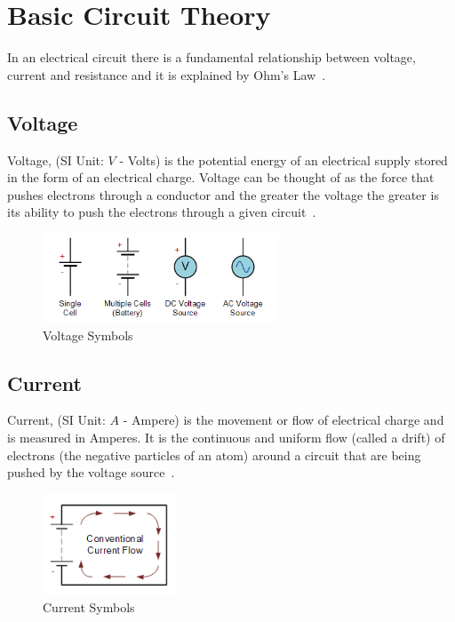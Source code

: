 \newpage
\section*{Basic Circuit Theory}

In an electrical circuit there is a fundamental relationship between voltage, current and resistance and it is explained by Ohm’s Law~\citep{et-15}.

\subsection*{Voltage}
Voltage, (SI Unit: $V$ - Volts) is the potential energy of an electrical supply stored in the form of an electrical charge. Voltage can be thought of as the force that pushes electrons through a conductor and the greater the voltage the greater is its ability to push the electrons through a given circuit~\citep{et-15}.

%
\begin{figure}[ht]
	\centering
	\includegraphics[width=7cm]{images/02}
	\caption{Voltage Symbols \citep{et-15}}
	\label{fig:voltage_symbols}
\end{figure}
%

\subsection*{Current}
Current, (SI Unit: $A$ - Ampere) is the movement or flow of electrical charge and is measured in Amperes. It is the continuous and uniform flow (called a drift) of electrons (the negative particles of an atom) around a circuit that are being pushed by the voltage source~\citep{et-15}.

%
\begin{figure}[ht]
	\centering
	\includegraphics[width=4cm]{images/03}
	\caption{Current Symbols \citep{et-15}}
	\label{fig:current_symbols}
\end{figure}
%

